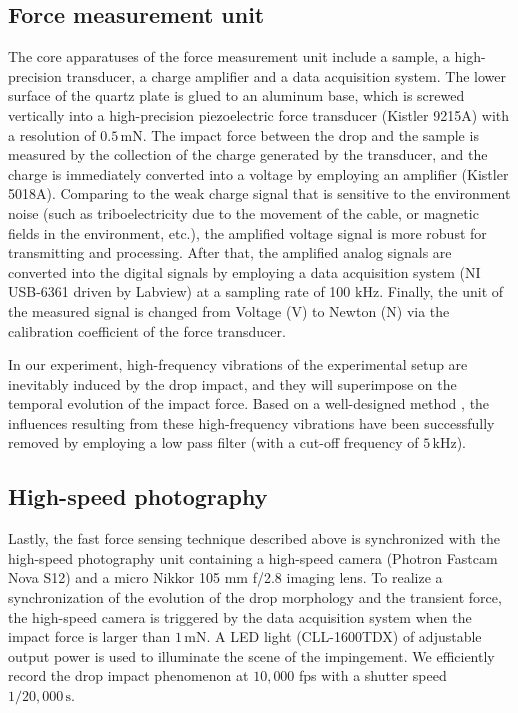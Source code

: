 \begin{subappendices}
		
	\subsection{Force measurement unit}\label{sec:Sample}
	
	The core apparatuses of the force measurement unit include a sample, a high-precision transducer, a charge amplifier and a data acquisition system. The lower surface of the quartz plate is glued to an aluminum base, which is screwed vertically into a high-precision piezoelectric force transducer (Kistler 9215A) with a resolution of $0.5\,\si{\milli\newton}$. The impact force between the drop and the sample is measured by the collection of the charge generated by the transducer, and the charge is immediately converted into a voltage by employing an amplifier (Kistler 5018A). Comparing to the weak charge signal that is sensitive to the environment noise (such as triboelectricity due to the movement of the cable, or magnetic fields in the environment, etc.), the amplified voltage signal is more robust for transmitting and processing. After that, the amplified analog signals are converted into the digital signals by employing a data acquisition system (NI USB-6361 driven by Labview) at a sampling rate of 100 kHz. Finally, the unit of the measured signal is changed from Voltage ($\si{\volt}$) to Newton ($\si{\newton}$) via the calibration coefficient of the force transducer. 
	
	In our experiment, high-frequency vibrations of the experimental setup are inevitably induced by the drop impact, and they will superimpose on the temporal evolution of the impact force. Based on a well-designed method \cite{li2014}, the influences resulting from these high-frequency vibrations have been successfully removed by employing a low pass filter (with a cut-off frequency of $5\,\si{\kilo\hertz}$).
	
	\subsection{High-speed photography}
	
	Lastly, the fast force sensing technique described above is synchronized with the high-speed photography unit containing a high-speed camera (Photron Fastcam Nova S12) and a micro Nikkor 105 mm f/2.8 imaging lens. To realize a synchronization of the evolution of the drop morphology and the transient force, the high-speed camera is triggered by the data acquisition system when the impact force is larger than $1\,\si{\milli\newton}$. A LED light (CLL-1600TDX) of adjustable output power is used to illuminate the scene of the impingement. We efficiently record the drop impact phenomenon at $10,000$ fps with a shutter speed $1/20,000\,\si{\second}$.
	

\end{subappendices}

